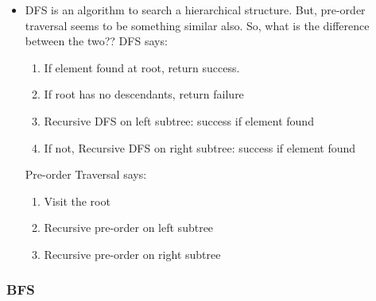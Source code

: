 \documentclass[a4paper,11pt,twoside]{book}
\begin{document}
\begin{itemize}
\item DFS is an algorithm to search a hierarchical structure. But, pre-order traversal seems to be something similar also. So, what is the difference between the two?? DFS says:
\begin{enumerate}
\item If element found at root, return success.
\item If root has no descendants, return failure
\item Recursive DFS on left subtree: success if element found
\item If not, Recursive DFS on right subtree: success if element found
\end{enumerate}
Pre-order Traversal says:
\begin{enumerate}
\item Visit the root
\item Recursive pre-order on left subtree
\item Recursive pre-order on right subtree
\end{enumerate}

\end{itemize}

\subsubsection{BFS}
\end{document}
